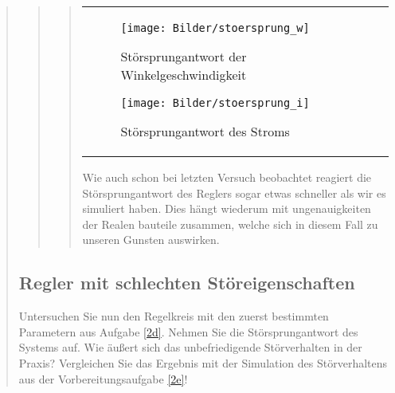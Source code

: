 \begin{quote}
\begin{quote}
\begin{quote}
\begin{center}
\begin{tabular}{ll}
        \hspace{-4.5cm}
            \begin{minipage}{0.6\textwidth}
                
                \begin{figure}[H]
                    \label{fig:stoersprung_w}
                    \texttt{[image: Bilder/stoersprung\_w]}
                    \caption{Störsprungantwort der Winkelgeschwindigkeit}
                \end{figure}
                
            \end{minipage}
            
            \begin{minipage}{0.6\textwidth}
                \begin{figure}[H]
                    \label{fig:stoersprung_i}
                    \texttt{[image: Bilder/stoersprung\_i]}
                    \caption{Störsprungantwort des Stroms}
                \end{figure}
                
            \end{minipage}
            
        \end{tabular}
        \end{center}
        \vspace{2em}
        
        Wie auch schon bei letzten Versuch beobachtet reagiert die Störsprungantwort des Reglers sogar etwas schneller als wir es
        simuliert haben. Dies hängt wiederum mit ungenauigkeiten der Realen bauteile zusammen, welche sich in diesem Fall zu
        unseren Gunsten auswirken.
        
        
        \end{quote}
    
    \end{quote}
    
    
    \subsection{Regler mit schlechten Störeigenschaften}
    Untersuchen Sie nun den Regelkreis mit den zuerst bestimmten Parametern aus Aufgabe
    \ref{2d}. Nehmen Sie die Störsprungantwort des Systems auf. Wie äußert sich das unbefriedigende Störverhalten in der Praxis?
    Vergleichen Sie das Ergebnis mit der Simulation des Störverhaltens aus der Vorbereitungsaufgabe \ref{2e}!
    

\end{quote}
